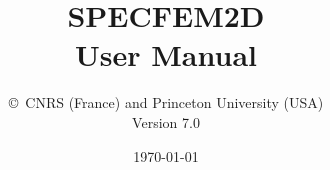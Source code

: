 \documentclass[oneside,english]{book}
\begin{document}
\thispagestyle{empty}
\vspace*{\fill}
\begingroup
\centering
{}
\endgroup
\vspace*{\fill}
\restoregeometry

\title{\textbf{SPECFEM2D}\\
\textbf{User Manual}}

\author{\copyright\ CNRS (France) and Princeton University (USA)\\
Version 7.0
}

\date{\today}

\maketitle
\end{document}
